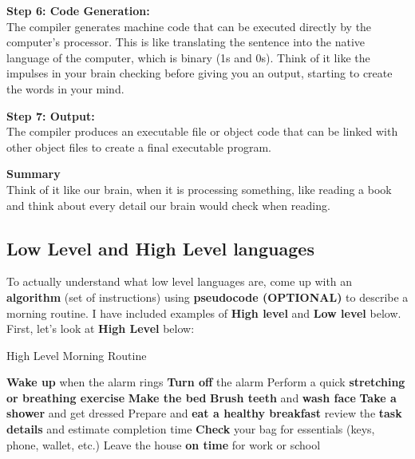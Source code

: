 \documentclass[a4paper,12pt]{article}
\begin{document}
\textbf{Step 6: Code Generation:}\\
The compiler generates machine code that can be executed directly by the computer’s processor. This is like translating the sentence into the native language of the computer, which is binary (1s and 0s). Think of it like the impulses in your brain checking before giving you an output, starting to create the words in your mind. 

\textbf{Step 7: Output:}\\
The compiler produces an executable file or object code that can be linked with other object files to create a final executable program.

\textbf{Summary}\\
Think of it like our brain, when it is processing something, like reading a book and think about every detail our brain would check when reading.

\hrulefill

\subsection{Low Level and High Level languages}

To actually understand what low level languages are, come up with an \textbf{algorithm} (set of instructions) using \textbf{pseudocode (OPTIONAL)} to describe a morning routine. I have included examples of \textbf{High level} and \textbf{Low level} below. First, let's look at \textbf{High Level} below: 

\begin{algorithm}[H]
\caption{High Level Morning Routine}
\begin{algorithmic}[1]
    \State \textbf{Wake up} when the alarm rings
    \State \textbf{Turn off} the alarm
        \State Perform a quick \textbf{stretching or breathing exercise}
    \EndIf
    \State \textbf{Make the bed}
    \State \textbf{Brush teeth} and \textbf{wash face}
    \State \textbf{Take a shower} and get dressed
    \State Prepare and \textbf{eat a healthy breakfast}
        \State review the \textbf{task details} and estimate completion time
    \EndFor
    \State \textbf{Check} your bag for essentials (keys, phone, wallet, etc.)
    \State Leave the house \textbf{on time} for work or school
\EndProcedure
\end{algorithmic}
\end{algorithm}
\end{document}
